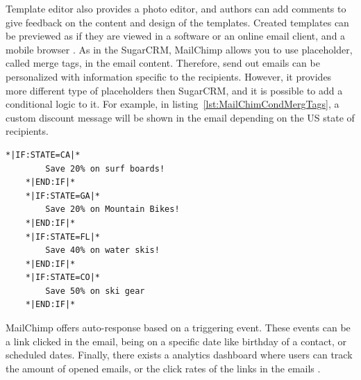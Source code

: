 Template editor also provides a photo editor, and authors can add comments to give feedback on the content and design of the templates. Created templates can be previewed as if they are viewed in a software or an online email client, and a mobile browser \citep{TheRocketScienceGroupLLC2013a}. As in the SugarCRM, MailChimp allows you to use placeholder, called merge tags, in the email content. Therefore, send out emails can be personalized with information specific to the recipients. However, it provides more different type of placeholders then SugarCRM, and it is possible to add a conditional logic to it. For example, in listing~\ref{lst:MailChimCondMergTags}, a custom discount message will be shown in the email depending on the US state of recipients.
\vspace{1cm}


\begin{lstlisting}[language=XML, caption={[MailChimp's Conditional Merge Tags]MailChimp's Conditional Merge Tags \citep{TheRocketScienceGroupLLC2013b}}, label={lst:MailChimCondMergTags}]
	*|IF:STATE=CA|*
		Save 20% on surf boards!
	*|END:IF|* 
	*|IF:STATE=GA|*
		Save 20% on Mountain Bikes!
	*|END:IF|* 
	*|IF:STATE=FL|*
		Save 40% on water skis!
	*|END:IF|* 
	*|IF:STATE=CO|*
		Save 50% on ski gear
	*|END:IF|*
\end{lstlisting}

MailChimp offers auto-response based on a triggering event. These events can be a link clicked in the email, being on a specific date like birthday of a contact, or scheduled dates. Finally, there exists a analytics dashboard where users can track the amount of opened emails, or the click rates of the links in the emails \citep{TheRocketScienceGroupLLC2013c,TheRocketScienceGroupLLC2013d}.

